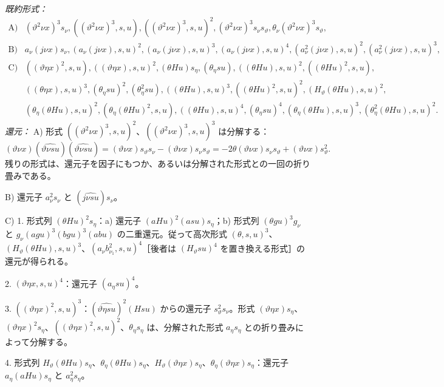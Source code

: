 \documentclass[11pt]{jlreq}
\begin{document}
\noindent\emph{既約形式：}
\[
\begin{array}{rl}
\text{A)}& (\vartheta^2\nu x)^3s_\nu,
((\vartheta^2\nu x)^3,s,u),
((\vartheta^2\nu x)^3,s,u)^2,
(\vartheta^2\nu x)^3s_\nu s_\vartheta,
\theta_\nu(\vartheta^2\nu x)^3s_\vartheta,\\[0.3em]
\text{B)}& a_\nu(j\nu x)s_\nu,
(a_\nu(j\nu x),s,u)^2,
(a_\nu(j\nu x),s,u)^3,
(a_\nu(j\nu x),s,u)^4,
(a_\nu^2(j\nu x),s,u)^2,
(a_\nu^2(j\nu x),s,u)^3,\\[0.3em]
\text{C)}& ((\vartheta\eta x)^2,s,u),
((\vartheta\eta x),s,u)^2,
(\theta Hu)s_\eta,
(\theta_\eta su),
((\theta Hu),s,u)^2,
((\theta Hu)^2,s,u),\\
& ((\theta\eta x),s,u)^3,
(\theta_\eta su)^2,
(\theta_\eta^2su),
((\theta Hu),s,u)^3,
((\theta Hu)^2,s,u)^2,
(H_\vartheta(\theta Hu),s,u)^2,\\
& (\theta_\eta(\theta Hu),s,u)^2,
(\theta_\eta(\theta Hu)^2,s,u),
((\theta Hu),s,u)^4,
(\theta_\eta su)^4,
(\theta_\eta(\theta Hu),s,u)^3,
(\theta_\eta^2(\theta Hu),s,u)^2.
\end{array}
\]
\noindent\emph{還元：}
A) 形式 $((\vartheta^2\nu x)^3,s,u)^2$、$((\vartheta^2\nu x)^3,s,u)^3$ は分解する：
\[
(\vartheta\nu x)(\widehat{\vartheta\nu su})(\widehat{\vartheta\nu su})=(\vartheta\nu x)s_\vartheta s_\nu-(\vartheta\nu x)s_\nu s_\vartheta=-2\theta(\vartheta\nu x)s_\nu s_\vartheta+(\vartheta\nu x)s_\vartheta^2.
\]
残りの形式は、還元子を因子にもつか、あるいは分解された形式との一回の折り畳みである。

B) 還元子 $a_\nu^2s_\nu$ と $(\widehat{j\nu su})s_\nu$。

C) 1. 形式列 $(\theta Hu)^2s_\eta$：a) 還元子 $(aHu)^2(asu)s_\eta$；b) 形式列 $(\theta gu)^3g_\nu$ と $g_\nu(agu)^3(bgu)^3(abu)$ の二重還元。従って高次形式 $(\theta,s,u)^3$、$(H_\vartheta(\theta Hu),s,u)^3$、$(a_\nu b_{\nu_1}^2,s,u)^4$［後者は $(H_\vartheta su)^4$ を置き換える形式］の還元が得られる。

2. $(\vartheta\eta x,s,u)^4$：還元子 $(a_\eta su)^4$。

3. $((\vartheta\eta x)^2,s,u)^3$：$(\widehat{\vartheta\eta su})^2(Hsu)$ からの還元子 $s_\vartheta^2s_\nu$。形式 $(\vartheta\eta x)s_\eta$、$(\vartheta\eta x)^2s_\eta$、$((\vartheta\eta x)^2,s,u)^2$、$\theta_\eta s_\eta$ は、分解された形式 $a_\eta s_\eta$ との折り畳みによって分解する。

4. 形式列 $H_\vartheta(\theta Hu)s_\eta$、$\theta_\eta(\theta Hu)s_\eta$、$H_\vartheta(\vartheta\eta x)s_\eta$、$\theta_\eta(\vartheta\eta x)s_\eta$：還元子 $a_\eta(aHu)s_\eta$ と $a_\eta^2s_\eta$。
\end{document}
